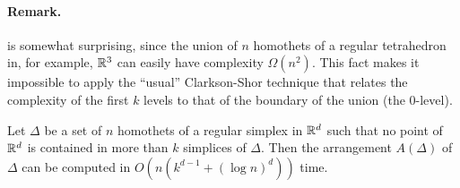 \documentclass[lotsofwhite]{patmorin}
\begin{document}

\paragraph{Remark.}  is somewhat surprising, since the
union of $n$ homothets of a regular tetrahedron in, for example, $\mathbb{R}^3$ can
easily have complexity $\Omega(n^2)$.  This fact makes it impossible to
apply the ``usual'' Clarkson-Shor technique \cite{cs89} that relates the
complexity of the first $k$ levels to that of the boundary of the union
(the 0-level).

\begin{lem}
  Let $\Delta$ be a set of $n$ homothets of a regular simplex in
  $\mathbb{R}^d$ such that no point of $\mathbb{R}^d$ is contained in more than $k$
  simplices of $\Delta$.  Then the arrangement $A(\Delta)$ of $\Delta$
  can be computed in $O(n(k^{d-1}+(\log n)^{d}))$ time.
\end{lem}
\end{document}
